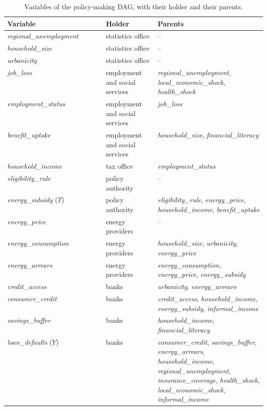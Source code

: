 \documentclass[a4paper,11pt]{article}
\begin{document}
\begin{table}[h]\centering\small
\caption{Variables of the policy-making DAG, with their holder and their parents.}
\label{tab:dag}
\begin{tabular}{@{}l >{\raggedright\arraybackslash}p{0.2\linewidth} >{\raggedright\arraybackslash}p{0.42\linewidth}@{}}
\toprule
Variable & Holder & Parents \\
\midrule
\textit{regional\_unemployment} & statistics office & -- \\
\textit{household\_size} & statistics office & -- \\
\textit{urbanicity} & statistics office & -- \\
\textit{job\_loss} & employment and social services & \textit{regional\_unemployment}, \textit{local\_economic\_shock}, \textit{health\_shock} \\
\textit{employment\_status} & employment and social services & \textit{job\_loss} \\
\textit{benefit\_uptake} & employment and social services & \textit{household\_size}, \textit{financial\_literacy} \\
\textit{household\_income} & tax office & \textit{employment\_status} \\
\textit{eligibility\_rule} & policy authority & -- \\
\textit{energy\_subsidy} ($T$) & policy authority & \textit{eligibility\_rule}, \textit{energy\_price}, \textit{household\_income}, \textit{benefit\_uptake} \\
\textit{energy\_price} & energy providers & -- \\
\textit{energy\_consumption} & energy providers & \textit{household\_size}, \textit{urbanicity}, \textit{energy\_price} \\
\textit{energy\_arrears} & energy providers & \textit{energy\_consumption}, \textit{energy\_price}, \textit{energy\_subsidy} \\
\textit{credit\_access} & banks & \textit{urbanicity}, \textit{energy\_arrears} \\
\textit{consumer\_credit} & banks & \textit{credit\_access}, \textit{household\_income}, \textit{energy\_subsidy}, \textit{informal\_income} \\
\textit{savings\_buffer} & banks & \textit{household\_income}, \textit{financial\_literacy} \\
\textit{loan\_defaults} ($Y$) & banks & \textit{consumer\_credit}, \textit{savings\_buffer}, \textit{energy\_arrears}, \textit{household\_income}, \textit{regional\_unemployment}, \textit{insurance\_coverage}, \textit{health\_shock}, \textit{local\_economic\_shock}, \textit{informal\_income} \\

\end{tabular}
\end{table}
\end{document}
